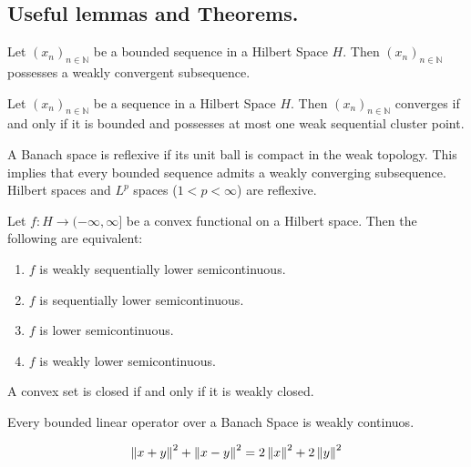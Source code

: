 \subsection{Useful lemmas and Theorems.}
\begin{lemma}
	\label{lemma0. Bounded and weakly convergent}
	Let $(x_n)_{n \in \mathbb{N}}$ be a bounded sequence in a Hilbert Space $H$. Then $(x_n)_{n \in \mathbb{N}}$ possesses a weakly convergent subsequence.
\end{lemma}

\begin{lemma}
Let $(x_n)_{n \in \mathbb{N}}$ be a sequence in a Hilbert Space $H$. Then $(x_n)_{n \in \mathbb{N}}$ converges if and only if it is bounded and possesses at most one weak sequential cluster point.
\end{lemma}
\begin{fact}
	A Banach space is reflexive if its unit ball is compact in the weak topology. This implies that every bounded sequence admits a weakly converging subsequence. Hilbert spaces and $L^p$ spaces ($1<p<\infty$) are reflexive.
\end{fact}
\begin{theorem} 
	Let $f: H \rightarrow (−\infty, \infty]$ be a convex functional on a Hilbert space. Then the following are equivalent:
	\begin{enumerate}[label=(\roman{*})]
\item 	$f$ is weakly sequentially lower semicontinuous.
\item 	$f$ is sequentially lower semicontinuous.
\item 	$f$ is lower semicontinuous.
\item 	$f$ is weakly lower semicontinuous.
	\end{enumerate}
\end{theorem}



\begin{lemma}
	A convex set is closed if and only if it is weakly closed.
\end{lemma}

\begin{lemma}
	Every bounded linear operator over a Banach Space is weakly continuos.
\end{lemma}

\begin{lemma}
	
\[
\left\lVert x+y\right\rVert^2 +\left\lVert x-y\right\rVert^2 = 2\left\lVert x\right\rVert^2+2\left\lVert y\right\rVert^2
\]
\end{lemma}


